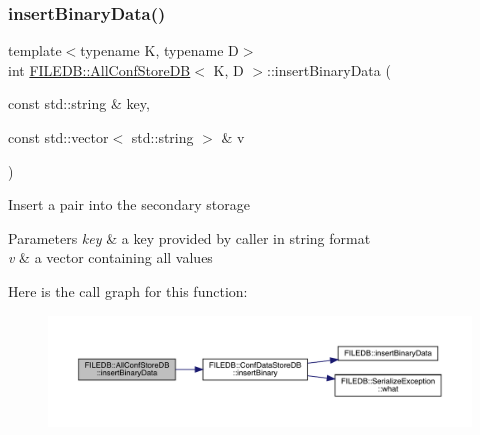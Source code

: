 \subsubsection{\texorpdfstring{insertBinaryData()}{insertBinaryData()}\hspace{0.1cm}{\footnotesize\ttfamily [1/2]}}
{\footnotesize\ttfamily template$<$typename K, typename D$>$ \\
int \mbox{\hyperlink{classFILEDB_1_1AllConfStoreDB}{F\+I\+L\+E\+D\+B\+::\+All\+Conf\+Store\+DB}}$<$ K, D $>$\+::insert\+Binary\+Data (\begin{DoxyParamCaption}\item[{const std\+::string \&}]{key,  }\item[{const std\+::vector$<$ std\+::string $>$ \&}]{v }\end{DoxyParamCaption})\hspace{0.3cm}{\ttfamily [inline]}}

Insert a pair into the secondary storage 
\begin{DoxyParams}{Parameters}
{\em key} & a key provided by caller in string format \\
\hline
{\em v} & a vector containing all values \\
\hline
\end{DoxyParams}
Here is the call graph for this function\+:
\nopagebreak
\begin{figure}[H]
\begin{center}
\leavevmode
\includegraphics[width=350pt]{df/db6/classFILEDB_1_1AllConfStoreDB_ac2c898624d4b32c526951edfb6271d60_cgraph}
\end{center}
\end{figure}
\mbox{\label{classFILEDB_1_1AllConfStoreDB_ac2c898624d4b32c526951edfb6271d60}} 
